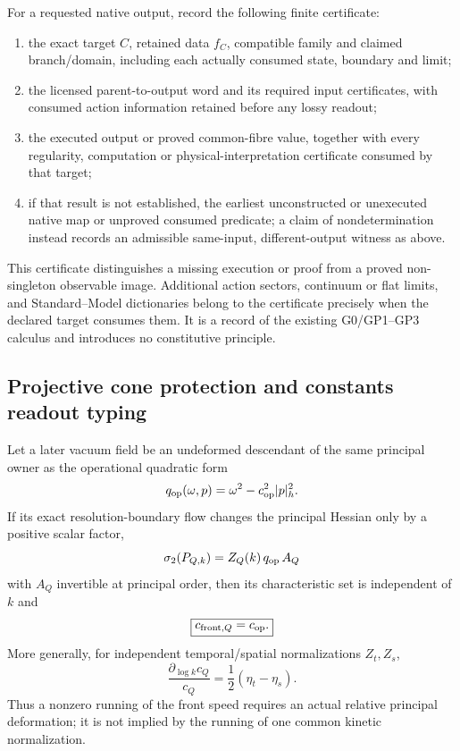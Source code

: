 \documentclass[12pt,a4paper]{article}
\begin{document}
\begin{definition}
\label{p3a:def:v188-native-completion-certificate}
For a requested native output, record the following finite certificate:
\begin{enumerate}
\item the exact target $C$, retained data $f_C$, compatible family and claimed
branch/domain, including each actually consumed state, boundary and limit;
\item the licensed parent-to-output word and its required input certificates,
with consumed action information retained before any lossy readout;
\item the executed output or proved common-fibre value, together with every
regularity, computation or physical-interpretation certificate consumed by
that target;
\item if that result is not established, the earliest unconstructed or unexecuted native map
or unproved consumed predicate; a claim of nondetermination instead records
an admissible same-input, different-output witness as above.
\end{enumerate}
This certificate distinguishes a missing execution or proof from a proved
non-singleton observable image.  Additional action sectors, continuum or
flat limits, and Standard--Model dictionaries belong to the certificate
precisely when the declared target consumes them.  It is a record of the
existing G0/GP1--GP3 calculus and introduces no constitutive principle.
\end{definition}




\subsection{Projective cone protection and constants readout typing}
\label{p3a:sec:v185-cone-rg-metrology}

\begin{corollary}
\label{p3a:cor:v185-projective-cone-protection}
Let a later vacuum field be an undeformed descendant of the same principal
owner as the operational quadratic form
\[
 q_{\rm op}(\omega,p)=\omega^2-c_{\rm op}^2|p|_h^2.
\]
If its exact resolution-boundary flow changes the principal Hessian only by a
positive scalar factor,
\[
 \sigma_2(P_{Q,k})=Z_Q(k)\,q_{\rm op}\,A_Q
\]
with $A_Q$ invertible at principal order, then its characteristic set is
independent of $k$ and
\[
 \boxed{c_{{\rm front},Q}=c_{\rm op}.}
\]
More generally, for independent temporal/spatial normalizations
$Z_t,Z_s$,
\[
 \frac{\partial_{\log k}c_Q}{c_Q}
 =\frac12(\eta_t-\eta_s).
\]
Thus a nonzero running of the front speed requires an actual relative
principal deformation; it is not implied by the running of one common kinetic
normalization.
\end{corollary}
\end{document}
